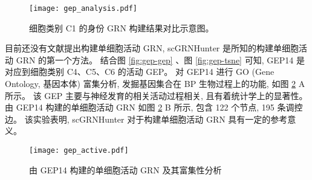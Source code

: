 \begin{figure}[!htbp]
    \centering
    \texttt{[image: gep\_analysis.pdf]}
    \caption{细胞类别 C1 的身份 GRN 构建结果对比示意图。}
    \label{fig:gep-grn-comparison}
\end{figure}


目前还没有文献提出构建单细胞活动 GRN, 
scGRNHunter 是所知的构建单细胞活动 GRN 的第一个方法。
结合图 \ref{fig:gep-gep} 、图 \ref{fig:gep-tsne} 可知, 
GEP14 是对应到细胞类别 C4、C5、C6 的活动 GEP。
对 GEP14 进行 GO (Gene Ontology, 基因本体) 富集分析, 发掘基因集合在 BP 生物过程上的功能, 如图 \ref{fig:gep-active} A 所示。
该 GEP 主要与神经发育的相关活动过程相关, 且有着统计学上的显著性。
由 GEP14 构建的单细胞活动 GRN 如图 \ref{fig:gep-active} B 所示, 包含 122 个节点, 195 条调控边。
该实验表明, scGRNHunter 对于构建单细胞活动 GRN 具有一定的参考意义。

\begin{figure}[!htbp]
    \centering
    \texttt{[image: gep\_active.pdf]}
    \caption{由 GEP14 构建的单细胞活动 GRN 及其富集性分析}
    \label{fig:gep-active}
\end{figure}







